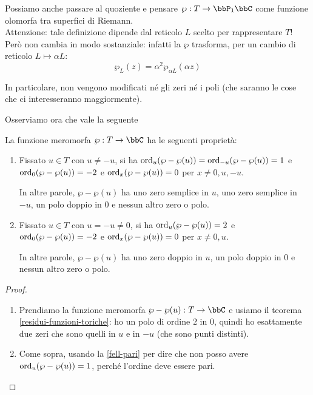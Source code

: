 Possiamo anche passare al quoziente e pensare $\wp:T\rar\bbP_1\bbC$ come funzione olomorfa tra superfici di Riemann.\\
Attenzione: tale definizione dipende dal reticolo $L$ scelto per rappresentare $T$! Però non cambia in modo sostanziale: infatti la $\wp$ trasforma, per un cambio di reticolo $L \mapsto \alpha L$:
\[
 \wp_L(z) = \alpha^2 \wp_{\alpha L}(\alpha z)
\]

In particolare, non vengono modificati né gli zeri né i poli (che saranno le cose che ci interesseranno maggiormente).

Osserviamo ora che vale la seguente
\begin{proposizione}
La funzione meromorfa $\wp:T\rar\bbC$ ha le seguenti proprietà:

\begin{enumerate}[label=\roman*]
    \item Fissato $u\in T$ con $u\not=-u$, si ha $\text{ord}_u(\wp-\wp(u))=\text{ord}_{-u}(\wp-\wp(u))=1$ e $\text{ord}_0(\wp-\wp(u))=-2$ e $\text{ord}_x(\wp-\wp(u))=0$ per $x\not=0,u,-u$.

    In altre parole, $\wp-\wp(u)$ ha uno zero semplice in $u$, uno zero semplice in $-u$, un polo doppio in $0$ e nessun altro zero o polo.

    \item Fissato $u\in T$ con $u=-u\not=0$, si ha $\text{ord}_u(\wp-\wp(u))=2$ e $\text{ord}_0(\wp-\wp(u))=-2$ e $\text{ord}_x(\wp-\wp(u))=0$ per $x\not=0,u$.

    In altre parole, $\wp-\wp(u)$ ha uno zero doppio in $u$, un polo doppio in $0$ e nessun altro zero o polo.
\end{enumerate}
\end{proposizione}

\begin{proof}$ $
\begin{enumerate}[label=\roman*]
    \item Prendiamo la funzione meromorfa $\wp-\wp(u):T\rar\bbC$ e usiamo il teorema \ref{residui-funzioni-toriche}: ho un polo di ordine $2$ in $0$, quindi ho esattamente due zeri che sono quelli in $u$ e in $-u$ (che sono punti distinti).

    \item Come sopra, usando la \ref{fell-pari} per dire che non posso avere $\text{ord}_u(\wp-\wp(u))=1$, perché l'ordine deve essere pari.
\end{enumerate}

\end{proof}


